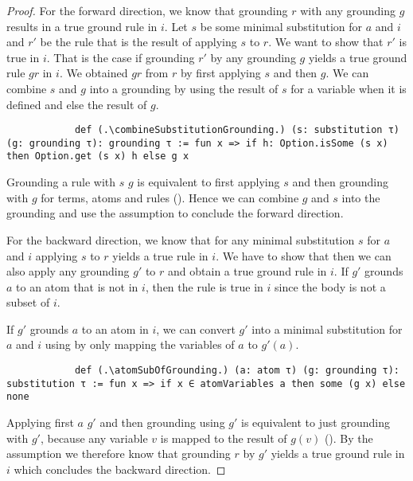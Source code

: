     \begin{proof}
        For the forward direction, we know that grounding $r$ with any grounding $g$ results in a true ground rule in $i$. Let $s$ be some minimal substitution for $a$ and $i$ and $r'$ be the rule that is the result of applying $s$ to $r$. We want to show that $r'$ is true in $i$. That is the case if grounding $r'$ by any grounding $g$ yields a true ground rule $gr$ in $i$. We obtained $gr$ from $r$ by first applying $s$ and then $g$. We can combine $s$ and $g$ into a grounding by using the result of $s$ for a variable when it is defined and else the result of $g$.

        \begin{lstlisting}
            def (.\combineSubstitutionGrounding.) (s: substitution τ) (g: grounding τ): grounding τ := fun x => if h: Option.isSome (s x) then Option.get (s x) h else g x
        \end{lstlisting}

        Grounding a rule with \combineSubstitutionGrounding $s$ $g$ is equivalent to first applying $s$ and then grounding with $g$ for terms, atoms and rules (\combineSubstitutionGroundingEquivRule). Hence we can combine $g$ and $s$ into the grounding \combineSubstitutionGrounding and use the assumption to conclude the forward direction.

        For the backward direction, we know that for any minimal substitution $s$ for $a$ and $i$ applying $s$ to $r$ yields a true rule in $i$. We have to show that then we can also apply any grounding $g'$ to $r$ and obtain a true ground rule in $i$. If $g'$ grounds $a$ to an atom that is not in $i$, then the rule is true in $i$ since the body is not a subset of $i$.

        If $g'$ grounds $a$ to an atom in $i$, we can convert $g'$ into a minimal substitution for $a$ and $i$ using \atomSubOfGrounding by only mapping the variables of $a$ to $g'(a)$.

        \begin{lstlisting}
            def (.\atomSubOfGrounding.) (a: atom τ) (g: grounding τ): substitution τ := fun x => if x ∈ atomVariables a then some (g x) else none
        \end{lstlisting}

        Applying first \atomSubOfGrounding $a$ $g'$ and then grounding using $g'$ is equivalent to just grounding with $g'$, because any variable $v$ is mapped to the result of $g(v)$
        (\atomSubOfGroundingGroundingEqGroundingOnRule). By the assumption we therefore know that grounding $r$ by $g'$ yields a true ground rule in $i$ which concludes the backward direction.
    \end{proof}

